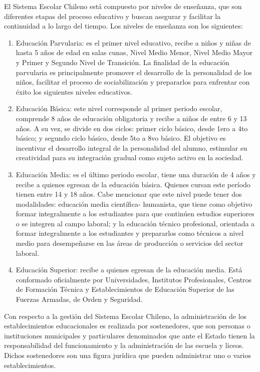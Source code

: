 El Sistema Escolar Chileno está compuesto por niveles de enseñanza, que son diferentes etapas del proceso educativo y buscan asegurar y facilitar la continuidad a lo largo del tiempo. 
Los niveles de enseñanza son los siguientes:

\begin{enumerate}
    \item Educación Parvularia: es el primer nivel educativo, recibe a niños y niñas de hasta 5 años de edad en salas cunas, Nivel Medio Menor, Nivel Medio Mayor y Primer y Segundo  Nivel de Transición. 
    La finalidad de la educación parvularia es principalmente promover el desarrollo de la personalidad de los niños, facilitar el proceso de sociabilización y prepararlos para enfrentar con éxito los siguientes niveles educativos.
    \item Educación Básica: este nivel corresponde al primer periodo escolar, comprende 8 años de educación obligatoria y recibe a niños de entre 6 y 13 años. A su vez, se divide en dos ciclos: primer ciclo básico, desde 1ero a 4to básico; y segundo ciclo básico, desde 5to a 8vo básico.
    El objetivo es incentivar el desarrollo integral de la personalidad del alumno, estimular su creatividad para su integración gradual como sujeto activo en la sociedad.
    \item Educación Media: es el último periodo escolar, tiene una duración de 4 años y recibe a quienes egresan de la educación básica. Quienes cursan este período tienen entre 14 y 18 años. Cabe mencionar que este nivel puede tener dos modalidades: educación media científica- humanista, que tiene como objetivo formar integralmente a los estudiantes para que continúen estudios superiores o se integren al campo laboral; y la educación técnico profesional, orientada a formar integralmente a los estudiantes y prepararlos como técnicos a nivel medio para desempeñarse en las áreas de producción o servicios del sector laboral.
    \item Educación Superior: recibe a quienes egresan de la educación media. Está conformado oficialmente por Universidades, Institutos Profesionales, Centros de Formación Técnica y Establecimientos de Educación Superior de las Fuerzas Armadas, de Orden y Seguridad. 
\end{enumerate}

Con respecto a la gestión del Sistema Escolar Chileno, la administración de los establecimientos educacionales es realizada por sostenedores, que son personas o instituciones municipales y particulares denominados que ante el Estado tienen la responsabilidad del funcionamiento y la administración de las escuela y liceos. Dichos sostenedores son una figura jurídica que pueden administrar uno o varios establecimientos. 

